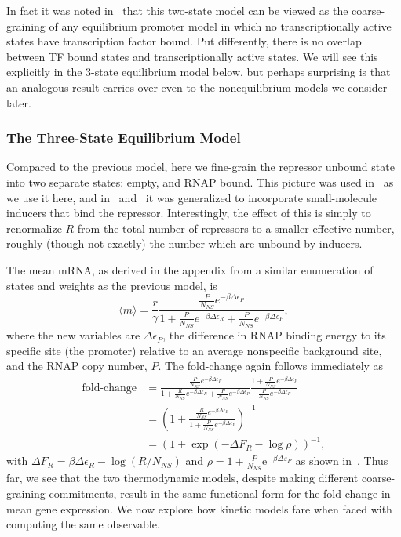 In fact it was noted in~\cite{Chure2019} that this two-state model can be viewed
as the coarse-graining of any equilibrium promoter model in which no
transcriptionally active states have transcription factor bound. Put
differently, there is no overlap between TF bound states and transcriptionally
active states. We will see this explicitly in the 3-state equilibrium model
below, but perhaps surprising is that an analogous result carries over even to
the nonequilibrium models we consider later.

\subsubsection{The Three-State Equilibrium Model}
Compared to the previous model, here we fine-grain the repressor unbound state
into two separate states: empty, and RNAP bound. This picture was used
in~\cite{Garcia2011a} as we use it here, and in~\cite{Razo-Mejia2018}
and~\cite{Chure2019} it was generalized to incorporate small-molecule inducers
that bind the repressor. Interestingly, the effect of this is simply to
renormalize $R$ from the total number of repressors to a smaller effective
number, roughly (though not exactly) the number which are unbound by inducers.

The mean mRNA, as derived in the appendix from a similar enumeration of states
and weights as the previous model, is
\begin{equation}
\langle m \rangle = \frac{r}{\gamma}
\frac{\frac{P}{N_{NS}} e^{-\beta\Delta\epsilon_P}}
        {
        1 + \frac{R}{N_{NS}} e^{-\beta\Delta\epsilon_R}
        + \frac{P}{N_{NS}} e^{-\beta\Delta\epsilon_P}
        },
\end{equation}
where the new variables are $\Delta\epsilon_P$, the difference in RNAP binding
energy to its specific site (the promoter) relative to an average nonspecific
background site, and the RNAP copy number, $P$. The fold-change again follows
immediately as
\begin{align}
\text{fold-change}
&= \frac{\frac{P}{N_{NS}} e^{-\beta\Delta\epsilon_P}}
        {
        1 + \frac{R}{N_{NS}} e^{-\beta\Delta\epsilon_R}
        + \frac{P}{N_{NS}} e^{-\beta\Delta\epsilon_P}
        }
\frac{1 + \frac{P}{N_{NS}} e^{-\beta\Delta\epsilon_P}}
        {\frac{P}{N_{NS}} e^{-\beta\Delta\epsilon_P}}
\\
&= \left(
1 + \frac{\frac{R}{N_{NS}} e^{-\beta\Delta\epsilon_R}}
        {1 + \frac{P}{N_{NS}} e^{-\beta\Delta\epsilon_P}}
\right)^{-1}
\\
&= (1 + \exp(-\Delta F_R - \log\rho))^{-1},
\end{align}
with $\Delta F_R = \beta\Delta\epsilon_R - \log(R/N_{NS})$ and $\rho = 1 +
\frac{P}{N_{NS}}\mathrm{e}^{-\beta\Delta\varepsilon_P}$ as shown
in~.  Thus far,
we see that the two thermodynamic models, despite making
different coarse-graining commitments, result in the same functional
form for the fold-change in mean gene expression.  We now
explore how kinetic models fare when faced with computing
the same observable.


